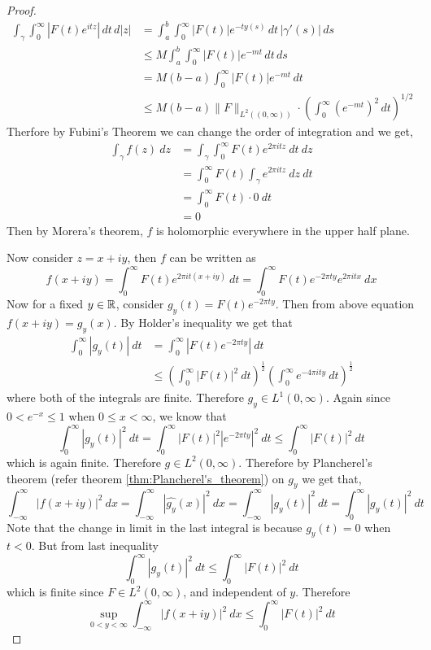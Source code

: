 \begin{proof}
  \begin{align*}
    \int_{\gamma}\int_{0}^{\infty}|F(t)e^{itz}|\,dt\,d|z|&=
    \int_a^b\int_{0}^{\infty}|F(t)|e^{-ty(s)}\,dt\,|\gamma'(s)|\,ds\\
    &\leq M\int_a^b\int_{0}^{\infty}|F(t)|e^{-mt}\,dt\,ds\\
    &=M(b-a)\int_{0}^{\infty}|F(t)|e^{-mt}\,dt\\
    &\leq M(b-a)\|F\|_{L^2((0,\infty))}\cdot\left(\int_{0}^{\infty}(e^{-mt})^2\,dt\right)^{1/2}
  \end{align*}
  Therfore by Fubini's Theorem we can change the order of integration and we get, 
  \begin{align*}
    \int_\gamma f(z)\ dz &= \int_\gamma \int_0^\infty F(t) e^{2\pi i t z} \ dt \ dz \\
    & = \int_0^\infty F(t) \int_\gamma e^{2\pi itz} \ dz \ dt \\
    & = \int_0^\infty F(t) \cdot 0 \ dt \\
    & = 0
  \end{align*}
  Then by Morera's theorem, $f$ is holomorphic everywhere in the upper half plane.

  Now consider $z=x+iy$, then $f$ can be written as $$f(x+iy) = \int_0^\infty F(t)e^{2\pi i t (x+iy)}\ dt = \int_0^\infty F(t)e^{-2\pi ty}e^{2\pi i tx} \ dx$$ 
  Now for a fixed $y \in \mathbb R$, consider $g_y(t) = F(t)e^{-2\pi ty}$. Then from above equation $f(x+iy) = \widehat{g_y}(x)$. By Holder's inequality we get that 
  \begin{align*}
    \int_0^\infty |g_y(t)| \ dt &= \int_0^\infty \left|F(t)e^{-2\pi ty}\right| \ dt \\
    &\le \left(\int_0^\infty \left|F(t)\right|^2 \ dt \right)^{\frac{1}{2}} \left(\int_0^\infty e^{-4\pi ity} \ dt \right)^{\frac{1}{2}}
  \end{align*}
  where both of the integrals are finite. Therefore $g_y \in L^1(0, \infty)$. Again since $0<e^{-x}\le1$ when $0\le x<\infty$, we know that $$\int_0^\infty |g_y(t)|^2 \ dt = \int_0^\infty \left|F(t)\right|^2 \left| e^{-2\pi ty} \right|^2 \ dt \le \int_0^\infty \left|F(t)\right|^2 \ dt$$
  which is again finite. Therefore $g\in L^2(0, \infty)$. Therefore by Plancherel's theorem (refer theorem \ref{thm:Plancherel's_theorem}) on $g_y$ we get that, $$\int_{-\infty}^{\infty}\left|f(x+iy)\right|^2 \ dx = \int_{-\infty}^{\infty} \left|\widehat{g_y}(x)\right|^2 \ dx= \int_{-\infty}^{\infty} \left|g_y(t)\right|^2 \ dt = \int_0^\infty \left|g_y(t)\right|^2 \ dt $$
Note that the change in limit in the last integral is because $g_y(t) = 0$ when $t < 0$. But from last inequality $$\int_0^\infty \left|g_y(t)\right|^2 \ dt \le \int_0^\infty \left|F(t)\right|^2 \ dt$$
  which is finite since $F \in L^2(0, \infty)$, and independent of $y$. Therefore $$\sup_{0<y<\infty} \int_{-\infty}^\infty \left|f(x+iy)\right|^2 \ dx \le \int_0^\infty \left|F(t)\right|^2 \ dt $$
\end{proof}

